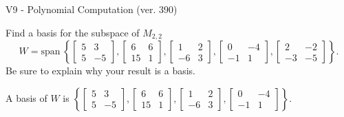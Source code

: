 \begin{exercise}
  \begin{exerciseTitle}V9 - Polynomial Computation (ver. 390)\end{exerciseTitle}
  \begin{exerciseStatement}
    Find a basis for the subspace of \(M_{2,2}\) 
\[W=\mathrm{span}\ \left\{\left[\begin{array}{cc}
5 & 3 \\
5 & -5
\end{array}\right] , \left[\begin{array}{cc}
6 & 6 \\
15 & 1
\end{array}\right] , \left[\begin{array}{cc}
1 & 2 \\
-6 & 3
\end{array}\right] , \left[\begin{array}{cc}
0 & -4 \\
-1 & 1
\end{array}\right] , \left[\begin{array}{cc}
2 & -2 \\
-3 & -5
\end{array}\right]\right\}.\]
 Be sure to explain why your result is a basis.


  \end{exerciseStatement}
  \begin{exerciseAnswer}
   A basis of \(W\) is  \(\left\{\left[\begin{array}{cc}
5 & 3 \\
5 & -5
\end{array}\right] , \left[\begin{array}{cc}
6 & 6 \\
15 & 1
\end{array}\right] , \left[\begin{array}{cc}
1 & 2 \\
-6 & 3
\end{array}\right] , \left[\begin{array}{cc}
0 & -4 \\
-1 & 1
\end{array}\right]\right\}\).
  


  \end{exerciseAnswer}
\end{exercise}